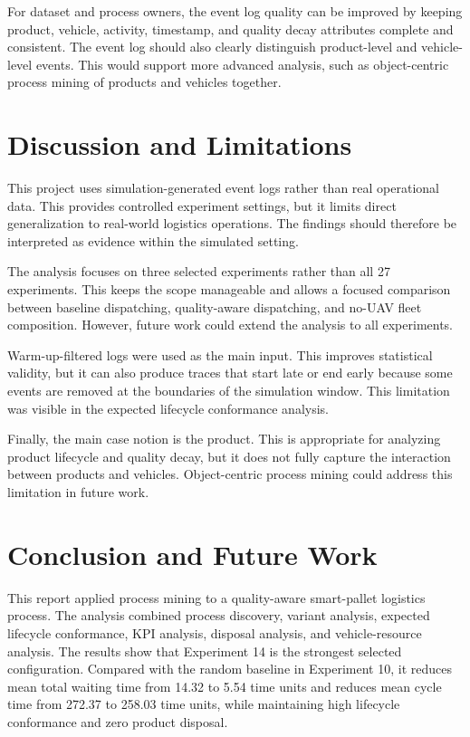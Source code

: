 \documentclass[conference]{IEEEtran}
\begin{document}
For dataset and process owners, the event log quality can be improved by keeping product, vehicle, activity, timestamp, and quality decay attributes complete and consistent. The event log should also clearly distinguish product-level and vehicle-level events. This would support more advanced analysis, such as object-centric process mining of products and vehicles together.

\section{Discussion and Limitations}

This project uses simulation-generated event logs rather than real operational data. This provides controlled experiment settings, but it limits direct generalization to real-world logistics operations. The findings should therefore be interpreted as evidence within the simulated setting.

The analysis focuses on three selected experiments rather than all 27 experiments. This keeps the scope manageable and allows a focused comparison between baseline dispatching, quality-aware dispatching, and no-UAV fleet composition. However, future work could extend the analysis to all experiments.

Warm-up-filtered logs were used as the main input. This improves statistical validity, but it can also produce traces that start late or end early because some events are removed at the boundaries of the simulation window. This limitation was visible in the expected lifecycle conformance analysis.

Finally, the main case notion is the product. This is appropriate for analyzing product lifecycle and quality decay, but it does not fully capture the interaction between products and vehicles. Object-centric process mining could address this limitation in future work.

\section{Conclusion and Future Work}

This report applied process mining to a quality-aware smart-pallet logistics process. The analysis combined process discovery, variant analysis, expected lifecycle conformance, KPI analysis, disposal analysis, and vehicle-resource analysis. The results show that Experiment 14 is the strongest selected configuration. Compared with the random baseline in Experiment 10, it reduces mean total waiting time from 14.32 to 5.54 time units and reduces mean cycle time from 272.37 to 258.03 time units, while maintaining high lifecycle conformance and zero product disposal.
\end{document}
